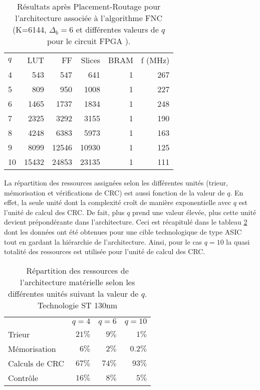 \begin{table}[!ht]
	\centering
	\caption{Résultats après Placement-Routage pour l'architecture associée à l'algorithme FNC (K=6144, 
	$\Delta_b = 6$ et différentes valeurs de $q$ pour le circuit FPGA  ). }
	\label{tab:fnc_impl_res_6}
	\begin{tabular}{lrrrrr} 
		\toprule
		$q$ & LUT   & FF    & Slices & BRAM & f (MHz) \\ 	\cmidrule(r){1-1}\cmidrule(l){2-6}
		4   & 543   & 547   & 641    & 1    & 267     \\ 
		5   & 809   & 950   & 1008   & 1    & 227     \\ 
		6   & 1465  & 1737  & 1834   & 1    & 248     \\ 
		7   & 2325  & 3292  & 3155   & 1    & 190     \\ 
		8   & 4248  & 6383  & 5973   & 1    & 163     \\ 
		9   & 8099  & 12546 & 10930  & 1    & 125     \\ 
		10  & 15432 & 24853 & 23135  & 1    & 111     \\ 
		\bottomrule 
	\end{tabular}
\end{table}

La répartition des ressources assignées selon les différentes unités (trieur, mémorisation et vérifications de CRC) est 
aussi fonction de la valeur de $q$. En effet, 
la seule unité dont la complexité croît de manière exponentielle avec $q$ est l'unité de calcul des CRC. De fait, plus $q$ prend une 
valeur élevée, plus cette unité devient prépondérante dans l'architecture. Ceci est récapitulé dans le tableau 
\ref{tab:fnc_arch_per} dont les données ont été obtenues pour une cible technologique de type ASIC tout en gardant la hiérarchie de 
l'architecture. Ainsi, pour le cas $q=10$ la quasi totalité des ressources est utilisée pour l'unité de calcul des CRC.

\begin{table}[!ht]
	\centering
	\caption{Répartition des ressources de l'architecture matérielle selon les différentes unités suivant la 
	valeur de $q$. Technologie ST 130nm}
	\label{tab:fnc_arch_per}
	\begin{tabular}{lrrr} 
		\toprule
		               & $q=4$  & $q=6$  & $q=10$  \\ 	\cmidrule(r){2-2}\cmidrule(r){3-3}\cmidrule(r){4-4}
		Trieur         & $21\%$ & $9\%$  & $1\%$   \\ 
		Mémorisation   & $6\%$  & $2\%$  & $0.2\%$ \\ 
		Calculs de CRC & $67\%$ & $74\%$ & $93\%$  \\ 
		Contrôle       & $16\%$ & $8\%$  & $5\%$   \\ 
		\bottomrule 
	\end{tabular}
\end{table}

